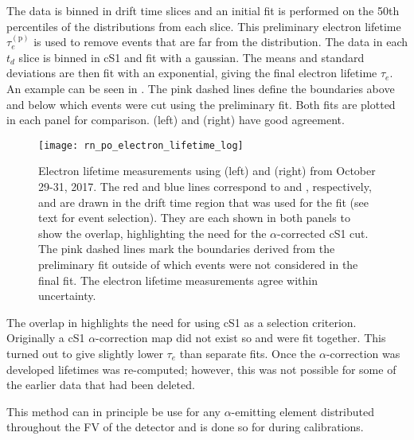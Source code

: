 The data is binned in drift time slices and an initial fit is performed on the 50th percentiles of the \stwob distributions from each
slice.  This preliminary electron lifetime $\tau_e^{(\mathrm{p})}$ is used to remove events that are far from the distribution.  The data
in each $t_d$ slice is binned in cS1 and fit with a gaussian.  The means and standard deviations are then fit
with an exponential, giving the final electron lifetime $\tau_e$.  An example can be seen in
.  The pink dashed lines define the boundaries above and below which
events were cut using the preliminary fit.  Both fits are plotted in each panel for comparison.   (left) and
 (right) have good agreement.

\begin{figure}
\centering
\texttt{[image: rn\_po\_electron\_lifetime\_log]}
\caption{Electron lifetime measurements using  (left) and  (right) from October 29-31, 2017.  The red and blue
lines correspond to  and , respectively, and are drawn in the drift time region that was used for the fit (see
text for event selection).  They are each shown in both panels to show the \stwob overlap, highlighting the need for the
$\alpha$-corrected cS1 cut.  The pink dashed lines mark the boundaries derived from the preliminary fit outside of which events were not
considered in the final fit.  The electron lifetime measurements agree within uncertainty.}
\label{fig:electron_lifetimes_measurement_alphas_elifetime}
\end{figure}

The overlap in \stwob highlights the need for using cS1 as a selection criterion.  Originally a cS1 $\alpha$-correction map did not
exist so  and  were fit together.  This turned out to give slightly lower $\tau_e$ than separate fits.  Once
the $\alpha$-correction was developed lifetimes was re-computed; however, this was not possible for some of the earlier data that had been
deleted.

This method can in principle be use for any $\alpha$-emitting element distributed throughout the FV of the detector and is done so
for  during  calibrations.



